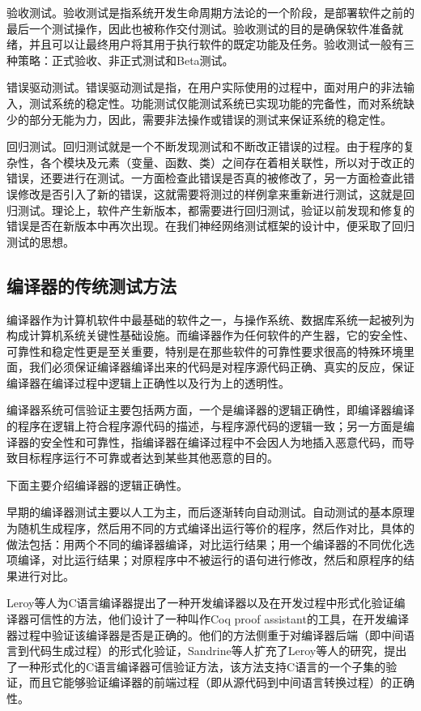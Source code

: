 验收测试。验收测试是指系统开发生命周期方法论的一个阶段，是部署软件之前的最后一个测试操作，因此也被称作交付测试。验收测试的目的是确保软件准备就绪，并且可以让最终用户将其用于执行软件的既定功能及任务。验收测试一般有三种策略：正式验收、非正式测试和Beta测试。

错误驱动测试。错误驱动测试是指，在用户实际使用的过程中，面对用户的非法输入，测试系统的稳定性。功能测试仅能测试系统已实现功能的完备性，而对系统缺少的部分无能为力，因此，需要非法操作或错误的测试来保证系统的稳定性。

回归测试。回归测试就是一个不断发现测试和不断改正错误的过程。由于程序的复杂性，各个模块及元素（变量、函数、类）之间存在着相关联性，所以对于改正的错误，还要进行在测试。一方面检查此错误是否真的被修改了，另一方面检查此错误修改是否引入了新的错误，这就需要将测过的样例拿来重新进行测试，这就是回归测试。理论上，软件产生新版本，都需要进行回归测试，验证以前发现和修复的错误是否在新版本中再次出现。在我们神经网络测试框架的设计中，便采取了回归测试的思想。

\subsection{编译器的传统测试方法}
编译器作为计算机软件中最基础的软件之一，与操作系统、数据库系统一起被列为构成计算机系统关键性基础设施。而编译器作为任何软件的产生器，它的安全性、可靠性和稳定性更是至关重要，特别是在那些软件的可靠性要求很高的特殊环境里面，我们必须保证编译器编译出来的代码是对程序源代码正确、真实的反应，保证编译器在编译过程中逻辑上正确性以及行为上的透明性。

编译器系统可信验证主要包括两方面，一个是编译器的逻辑正确性，即编译器编译的程序在逻辑上符合程序源代码的描述，与程序源代码的逻辑一致；另一方面是编译器的安全性和可靠性，指编译器在编译过程中不会因人为地插入恶意代码，而导致目标程序运行不可靠或者达到某些其他恶意的目的。

下面主要介绍编译器的逻辑正确性。

早期的编译器测试主要以人工为主，而后逐渐转向自动测试\cite{俞甲子2008gcc}。自动测试的基本原理为随机生成程序，然后用不同的方式编译出运行等价的程序，然后作对比，具体的做法包括：用两个不同的编译器编译，对比运行结果；用一个编译器的不同优化选项编译，对比运行结果；对原程序中不被运行的语句进行修改，然后和原程序的结果进行对比。

Leroy等人\cite{hannan1992compiler}为C语言编译器提出了一种开发编译器以及在开发过程中形式化验证编译器可信性的方法，他们设计了一种叫作Coq proof assistant的工具，在开发编译器过程中验证该编译器是否是正确的。他们的方法侧重于对编译器后端（即中间语言到代码生成过程）的形式化验证，Sandrine\cite{berezin2002model}等人扩充了Leroy等人的研究，提出了一种形式化的C语言编译器可信验证方法，该方法支持C语言的一个子集的验证，而且它能够验证编译器的前端过程（即从源代码到中间语言转换过程）的正确性。

